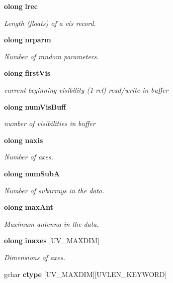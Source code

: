 \begin{CompactItemize}
{\bf olong} {\bf lrec}
\begin{CompactList}\small\item\em Length (floats) of a vis record. \item\end{CompactList}\item 
{\bf olong} {\bf nrparm}
\begin{CompactList}\small\item\em Number of random parameters. \item\end{CompactList}\item 
{\bf olong} {\bf first\-Vis}
\begin{CompactList}\small\item\em current beginning visibility (1-rel) read/write in buffer \item\end{CompactList}\item 
{\bf olong} {\bf num\-Vis\-Buff}
\begin{CompactList}\small\item\em number of visibilities in buffer \item\end{CompactList}\item 
{\bf olong} {\bf naxis}
\begin{CompactList}\small\item\em Number of axes. \item\end{CompactList}\item 
{\bf olong} {\bf num\-Sub\-A}
\begin{CompactList}\small\item\em Number of subarrays in the data. \item\end{CompactList}\item 
{\bf olong} {\bf max\-Ant}
\begin{CompactList}\small\item\em Maximum antenna in the data. \item\end{CompactList}\item 
{\bf olong} {\bf inaxes} [UV\_\-MAXDIM]
\begin{CompactList}\small\item\em Dimensions of axes. \item\end{CompactList}\item 
gchar {\bf ctype} [UV\_\-MAXDIM][UVLEN\_\-KEYWORD]

\end{CompactItemize}
